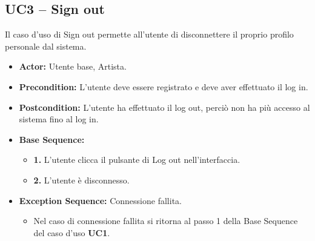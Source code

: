 \subsection{UC3 -- Sign out}
Il caso d'uso di Sign out permette all'utente di disconnettere il 
proprio profilo personale dal sistema.
\begin{itemize}
    \item \textbf{Actor:} Utente base, Artista.
    \item \textbf{Precondition:} L'utente deve essere registrato e deve aver 
        effettuato il log in.
    \item \textbf{Postcondition:} L'utente ha effettuato il log out, perciò non ha più accesso al sistema fino al log in.
    \item \textbf{Base Sequence:}
    \begin{itemize}
        \item \textbf{1.} L'utente clicca il pulsante di Log out nell'interfaccia.
        \item \textbf{2.} L'utente è disconnesso.
    \end{itemize}
    \item \textbf{Exception Sequence:} Connessione fallita.
    \begin{itemize}
        \item Nel caso di connessione fallita si ritorna al passo 1 della Base Sequence del caso d'uso \textbf{UC1}.
    \end{itemize}
\end{itemize}
\vspace{1cm}

